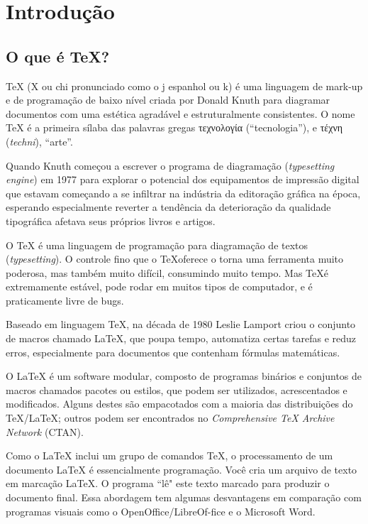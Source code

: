 \documentclass[a4paper,nols,bidi,nohyper,nobib]{tufte-book}
\begin{document}
\vfill
\cleardoublepage

\tableofcontents

\listoffigures

\listoftables

\mainmatter
\chapter{Introdução}

\section{O que é TeX?}
\TeX{} (X ou chi pronunciado como o j espanhol ou k) é uma linguagem de mark-up e de programação de baixo nível criada por Donald Knuth para diagramar documentos com uma estética agradável e estruturalmente consistentes. O nome \TeX{} é a primeira sílaba das palavras gregas \textgreek{τεχνολογία} (``tecnologia''), e \textgreek{τέχνη} (\textit{techni}), ``arte''.
	
Quando Knuth começou a escrever o programa de diagramação (\textit{typesetting engine}) em 1977 para explorar o potencial dos equipamentos de impressão digital que estavam começando a se infiltrar na indústria da editoração gráfica na época, esperando especialmente reverter a tendência da deterioração da qualidade tipográfica afetava seus próprios livros e artigos.

O TeX é uma linguagem de programação para diagramação de textos (\textit{typesetting}). O controle fino que o \TeX oferece o torna uma ferramenta muito poderosa, mas também muito difícil, consumindo muito tempo.  Mas \TeX é extremamente estável, pode rodar em muitos tipos de computador, e é praticamente livre de bugs.

Baseado em linguagem \TeX, na década de 1980 Leslie Lamport criou o conjunto de macros chamado \LaTeX, que poupa tempo, automatiza certas tarefas e reduz erros, especialmente para documentos que contenham fórmulas matemáticas.

O \LaTeX{} é um software modular, composto de programas binários e conjuntos de macros chamados pacotes ou estilos, que podem ser utilizados, acrescentados e modificados. Alguns destes são empacotados com a maioria das distribuições do TeX/\LaTeX; outros podem ser encontrados no \textit{Comprehensive TeX Archive Network} (CTAN).

Como o \LaTeX{} inclui um grupo de comandos TeX, o processamento de um documento \LaTeX{} é essencialmente programação. Você cria um arquivo de texto em marcação \LaTeX. O programa ``lê" este texto marcado para produzir o documento final.
Essa abordagem tem algumas desvantagens em comparação com programas visuais como o OpenOffice/Li\-bre\-Of-fice e o Microsoft Word.
\end{document}
